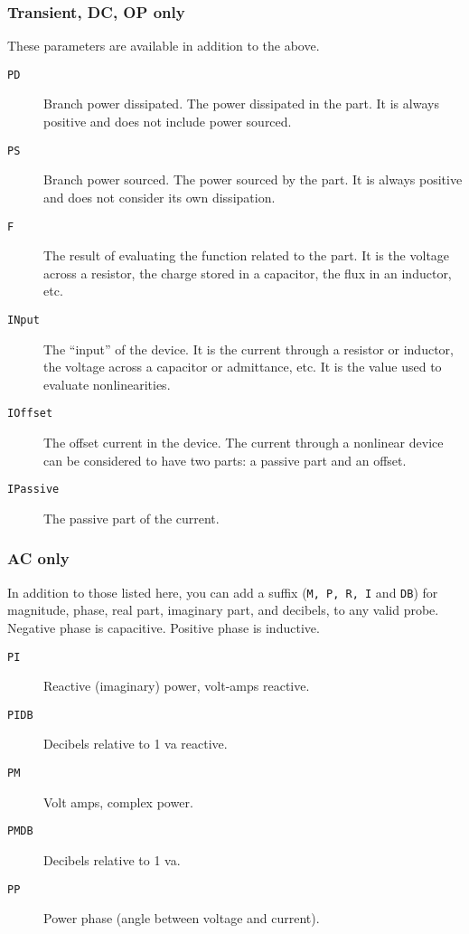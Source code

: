 \subsubsection{Transient, DC, OP only}

These parameters are available in addition to the above.

\begin{description}

\item[{\tt PD}] Branch power dissipated.  The power dissipated in the 
part.  It is always positive and does not include power sourced.

\item[{\tt PS}] Branch power sourced.  The power sourced by the part.  
It is always positive and does not consider its own dissipation.

\item[{\tt F}] The result of evaluating the function related to the 
part.  It is the voltage across a resistor, the charge stored in a 
capacitor, the flux in an inductor, etc.

\item[{\tt INput}] The ``input'' of the device.  It is the current
through a resistor or inductor, the voltage across a capacitor or
admittance, etc.  It is the value used to evaluate nonlinearities.

\item[{\tt IOffset}] The offset current in the device.  The current
through a nonlinear device can be considered to have two parts: a
passive part and an offset.

\item[{\tt IPassive}] The passive part of the current.

\end{description}
\subsubsection{AC only}

In addition to those listed here, you can add a suffix ({\tt M, P, R,
I} and {\tt DB}) for magnitude, phase, real part, imaginary part, and
decibels, to any valid probe.  Negative phase is capacitive.  Positive
phase is inductive.

\begin{description}

\item[{\tt PI}] Reactive (imaginary) power, volt-amps reactive.

\item[{\tt PIDB}] Decibels relative to 1 va reactive.

\item[{\tt PM}] Volt amps, complex power.

\item[{\tt PMDB}] Decibels relative to 1 va.

\item[{\tt PP}] Power phase (angle between voltage and current).

\end{description}
